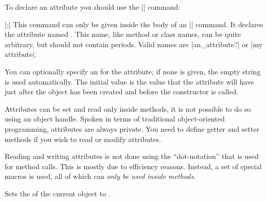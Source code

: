 To declare an attribute you should use the |\attribute| command:
%
\begin{command}{\attribute {}|;|}
    This command can only be given inside the body of an |\pgfooclass| command.
    It declares the attribute named . This name, like
    method or class names, can be quite arbitrary, but should not contain
    periods. Valid names are |an_attribute?| or |my attribute|.

    You can optionally specify an  for the attribute; if
    none is given, the empty string is used automatically. The initial value is
    the value that the attribute will have just after the object has been
    created and before the constructor is called.
\begin{codeexample}
\end{codeexample}
\end{command}

Attributes can be set and read only inside methods, it is not possible to do so
using an object handle. Spoken in terms of traditional object-oriented
programming, attributes are always private. You need to define getter and
setter methods if you wish to read or modify attributes.

Reading and writing attributes is not done using the ``dot-notation'' that is
used for method calls. This is mostly due to efficiency reasons. Instead, a set
of special macros is used, all of which can \emph{only be used inside methods}.

\begin{command}{\pgfooset{}}
    Sets the  of the current object to .
\end{command}

